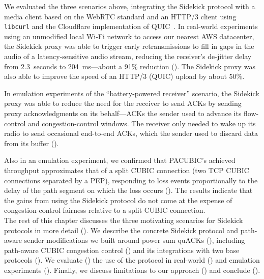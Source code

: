 We evaluated the three scenarios above, integrating the Sidekick protocol with a
media client based on the WebRTC standard and an HTTP/3 client using
\texttt{libcurl} and the Cloudflare implementation of QUIC~\cite{quiche}.
In real-world experiments using an unmodified local Wi-Fi network to access our
nearest AWS datacenter, the Sidekick proxy was able to trigger early retransmissions
to fill in gaps in the audio of a latency-sensitive audio stream, reducing the
receiver's de-jitter delay from 2.3~seconds to 204~ms---about a 91\% reduction
(). The Sidekick proxy was also able to improve the
speed of an HTTP/3 (QUIC) upload by about 50\%.

In emulation experiments of the ``battery-powered receiver'' scenario,
the Sidekick proxy was able to reduce the need for the receiver to send ACKs
by sending proxy acknowledgments on its behalf---ACKs the sender used
to advance its flow-control and congestion-control windows. The
receiver only needed to wake up its radio to send occasional
end-to-end ACKs, which the sender used to discard data from its
buffer ().

Also in an emulation experiment, we confirmed that PACUBIC's achieved throughput
approximates that of a split CUBIC connection (two TCP CUBIC
connections separated by a PEP), responding to loss events proportionally to
the delay of the path segment on which the loss occurs
(). The results indicate that the gains from
using the Sidekick protocol do not come at the
expense of congestion-control fairness relative to a split CUBIC connection.\\

\noindent
The rest of this chapter discusses the three motivating scenarios for Sidekick
protocols in more detail (). We describe the
concrete Sidekick protocol and path-aware sender modifications we built around
power sum quACKs (), including path-aware CUBIC
congestion control () and its integrations with two
base protocols (). We evaluate
() the use of the protocol in real-world
() and emulation experiments
(). Finally, we discuss limitations to our approach
() and conclude ().
